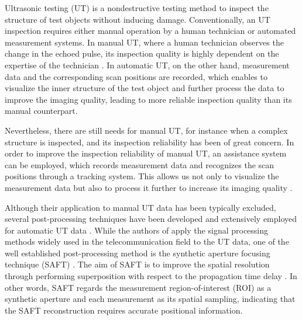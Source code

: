 
Ultrasonic testing (UT) is a nondestructive testing method to inspect the structure of test objects without inducing damage. Conventionally, an UT inspection requires either manual operation by a human technician or automated measurement systems. In manual UT, where a human technician observes the change in the echoed pulse, its inspection quality is highly dependent on the expertise of the technician \cite{Cawley01IMechE}. In automatic UT, on the other hand, measurement data and the corresponding scan positions are recorded, which enables to visualize the inner structure of the test object and further process the data to improve the imaging quality, leading to more reliable inspection quality than its manual counterpart. \par

Nevertheless, there are still needs for manual UT, for instance when a complex structure is inspected, and its inspection reliability has been of great concern. In order to improve the inspection reliability of manual UT, an assistance system can be employed, which records measurement data and recognizes the scan positions through a tracking system. This allows us not only to visualize the measurement data but also to process it further to increase its imaging quality \cite{Krieg18SHMNDT}. \par

Although their application to manual UT data has been typically excluded, several post-processing techniques have been developed and extensively employed for automatic UT data \cite{Ericsson98ECNDDT, Hall88, Krautkraemer90}. While the authors of \cite{Ericsson98ECNDDT} apply the signal processing methods widely used in the telecommunication field to the UT data, one of the well established post-processing method is the synthetic aperture focusing technique (SAFT) \cite{Hall88, Krautkraemer90}. The aim of SAFT is to improve the spatial resolution through performing superposition with respect to the propagation time delay \cite{Lingvall04PhD}. In other words, SAFT regards the measurement region-of-interest (ROI) as a synthetic aperture and each measurement as its spatial sampling, indicating that the SAFT reconstruction requires accurate positional information. \par

